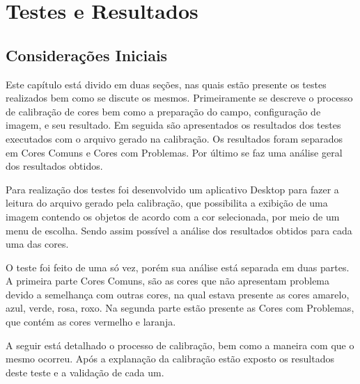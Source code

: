 % 
\chapter{Testes e Resultados} 
\section{Considerações Iniciais}
Este capítulo está divido em duas seções, nas quais estão presente os testes realizados bem como se discute os mesmos. Primeiramente se descreve o processo de calibração de cores bem como a preparação do campo, configuração de imagem, e seu resultado. Em seguida são apresentados os resultados dos testes executados com o arquivo gerado na calibração. Os resultados foram separados em Cores Comuns e Cores com Problemas. Por último se faz uma análise geral dos resultados obtidos.


 Para realização dos testes foi desenvolvido um aplicativo Desktop para fazer a leitura do arquivo gerado pela calibração, que possibilita a exibição de uma imagem contendo os objetos de acordo com a cor selecionada, por meio de um menu de escolha. Sendo assim possível a análise dos resultados obtidos para cada uma das cores. 
 
  O teste foi feito de uma só vez, porém sua análise está separada em duas partes. A primeira parte Cores Comuns, são as cores que não apresentam problema devido a semelhança com outras cores, na qual estava presente as cores amarelo, azul, verde, rosa, roxo. Na segunda parte estão presente as Cores com Problemas, que contém as cores vermelho e laranja. 
 
 A seguir está detalhado o processo de calibração, bem como a maneira com que o mesmo ocorreu. Após a explanação da calibração estão exposto os resultados deste teste e a validação de cada um.
